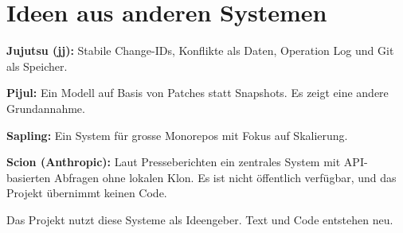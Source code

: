 \section{Ideen aus anderen Systemen}

\startitemize
\item \textbf{Jujutsu (jj):} Stabile Change-IDs, Konflikte als Daten, Operation Log und Git als Speicher.
\item \textbf{Pijul:} Ein Modell auf Basis von Patches statt Snapshots. Es zeigt eine andere Grundannahme.
\item \textbf{Sapling:} Ein System für grosse Monorepos mit Fokus auf Skalierung.
\item \textbf{Scion (Anthropic):} Laut Presseberichten ein zentrales System mit API-basierten Abfragen ohne lokalen Klon. Es ist nicht öffentlich verfügbar, und das Projekt übernimmt keinen Code.
\stopitemize

Das Projekt nutzt diese Systeme als Ideengeber. Text und Code entstehen neu.
